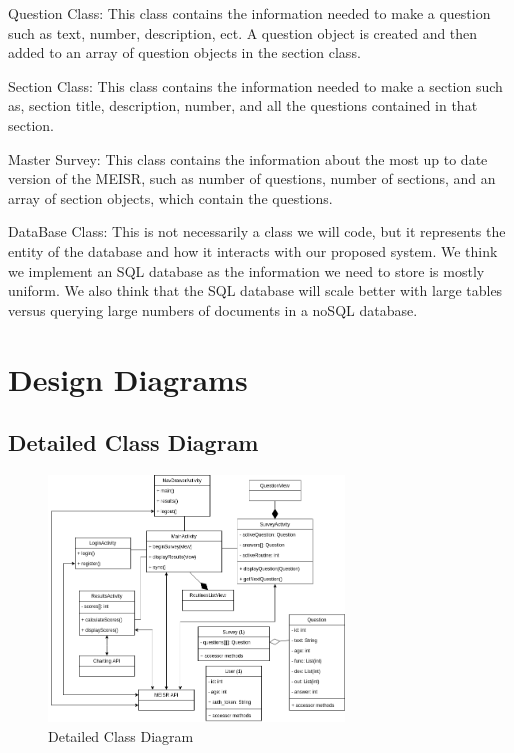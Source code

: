Question Class:
	This class contains the information needed to make a question such as text, number, description, ect. A question object is created and then added to an array of question objects in the section class.

Section Class:
	This class contains the information needed to make a section such as, section title, description, number, and all the questions contained in that section.

Master Survey:
	This class contains the information about the most up to date version of the MEISR, such as number of questions, number of sections, and an array of section objects, which contain the questions.

DataBase Class:
	This is not necessarily a class we will code, but it represents the entity of the database and how it interacts with our proposed system. We think we implement an SQL database as the information we need to store is mostly uniform. We also think that the SQL database will scale better with large tables versus querying large numbers of documents in a noSQL database.

\chapter{Design Diagrams}

\section{Detailed Class Diagram}

\begin{figure}[H]
  \centering
  \includegraphics[width=0.7\textwidth]{images/design_class_dia.png}
  \caption{Detailed Class Diagram}
  \label{fig:detClassDiagram}
\end{figure}

